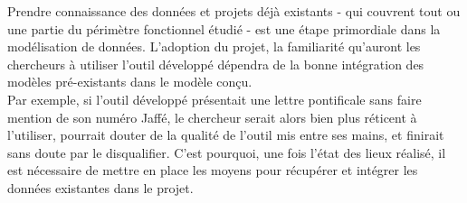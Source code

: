 Prendre connaissance des données et projets déjà existants -  qui couvrent tout ou une partie du périmètre fonctionnel étudié - est une étape primordiale dans la modélisation de données. L’adoption du projet, la familiarité qu’auront les chercheurs à utiliser l’outil développé dépendra de la bonne intégration des modèles pré-existants dans le modèle conçu.\\
Par exemple, si l’outil développé présentait une lettre pontificale sans faire mention de son numéro Jaffé, le chercheur serait alors bien plus réticent à l’utiliser, pourrait douter de la qualité de l’outil mis entre ses mains, et finirait sans doute par le disqualifier.
C’est pourquoi, une fois l’état des lieux réalisé, il est nécessaire de mettre en place les moyens pour récupérer et intégrer les données existantes dans le projet.


